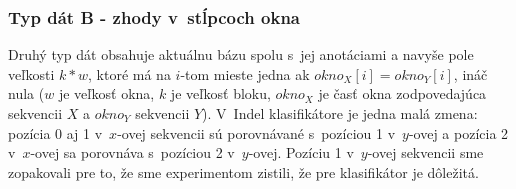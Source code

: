 
\subsubsection{Typ dát B - zhody v~stĺpcoch okna}

Druhý typ dát obsahuje aktuálnu bázu spolu s~jej anotáciami a navyše pole veľkosti $k*w$,
ktoré má na $i$-tom mieste jedna ak $okno_X[i] = okno_Y[i]$, ináč nula
($w$ je veľkosť okna, $k$ je veľkosť bloku, $okno_X$ je časť okna zodpovedajúca sekvencii $X$ a $okno_Y$ sekvencii $Y$).
V~Indel klasifikátore je jedna malá zmena: pozícia 0 aj 1 v~$x$-ovej sekvencii sú porovnávané s~pozíciou 1 v~$y$-ovej a pozícia 2 v~$x$-ovej sa porovnáva s~pozíciou 2 v~$y$-ovej.
Pozíciu 1 v~$y$-ovej sekvencii sme zopakovali pre to, že sme experimentom zistili, že pre klasifikátor je dôležitá.


